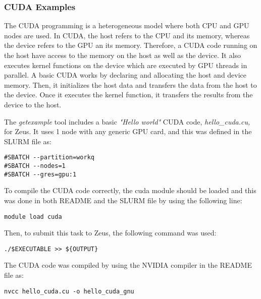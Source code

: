 \subsubsection{CUDA Examples}

The CUDA programming is a heterogeneous model where both CPU and GPU nodes are used. In CUDA, the host refers to the CPU and its memory, whereas the 
device refers to the GPU an its memory. Therefore, a CUDA code running on the host have access to the memory on the host as well as the device. It also 
executes kernel functions on the device which are executed by GPU threads in parallel. A basic CUDA works by declaring and allocating the host and device 
memory. Then, it initializes the host data and transfers the data from the host to the device. Once it executes the kernel function, it transfers the 
results from the device to the host.

The \emph{getexample} tool includes a basic \emph{"Hello world"} CUDA code, \emph{hello\_cuda.cu,} for Zeus. It uses 1 node with any generic GPU card, 
and this was defined in the SLURM file as:

\begin{tcolorbox}
\begin{Verbatim}[fontsize=\scriptsize]
#SBATCH --partition=workq
#SBATCH --nodes=1
#SBATCH --gres=gpu:1
\end{Verbatim}
\end{tcolorbox}

To compile the CUDA code correctly, the cuda module should be loaded and this was done in both README and the SLURM file by using the following line:

\begin{tcolorbox}
\begin{Verbatim}[fontsize=\scriptsize]
module load cuda
\end{Verbatim}
\end{tcolorbox}

Then, to submit this task to Zeus, the following command was used:

\begin{tcolorbox}
\begin{Verbatim}[fontsize=\scriptsize]
./$EXECUTABLE >> ${OUTPUT}
\end{Verbatim}
\end{tcolorbox}

The CUDA code was compiled by using the NVIDIA compiler in the README file as:

\begin{tcolorbox}
\begin{Verbatim}[fontsize=\scriptsize]
nvcc hello_cuda.cu -o hello_cuda_gnu
\end{Verbatim}
\end{tcolorbox}
